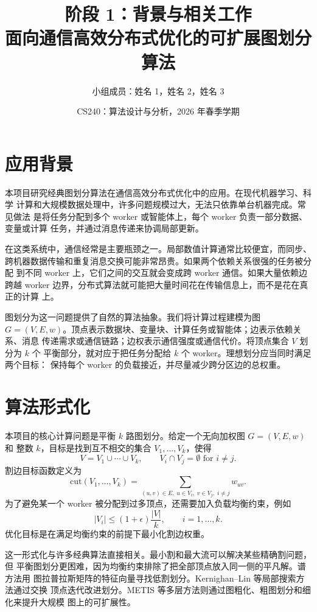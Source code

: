\documentclass[UTF8, 11pt]{ctexart}
\title{\textbf{阶段 1：背景与相关工作}\\
面向通信高效分布式优化的可扩展图划分算法}
\author{小组成员：姓名 1，姓名 2，姓名 3}
\date{CS240：算法设计与分析，2026 年春季学期}
\begin{document}
\maketitle

\section{应用背景}

本项目研究经典图划分算法在通信高效分布式优化中的应用。在现代机器学习、科学
计算和大规模数据处理中，许多问题规模过大，无法只依靠单台机器完成。常见做法
是将任务分配到多个 worker 或智能体上，每个 worker 负责一部分数据、变量或计算
任务，并通过消息传递来协调局部更新。

在这类系统中，通信经常是主要瓶颈之一。局部数值计算通常比较便宜，而同步、
跨机器数据传输和重复消息交换可能非常昂贵。如果两个依赖关系很强的任务被分配
到不同 worker 上，它们之间的交互就会变成跨 worker 通信。如果大量依赖边跨越
worker 边界，分布式算法就可能把大量时间花在传输信息上，而不是花在真正的计算
上。

图划分为这一问题提供了自然的算法抽象。我们将计算过程建模为图
$G=(V,E,w)$。顶点表示数据块、变量块、计算任务或智能体；边表示依赖关系、消息
传递需求或通信链路；边权表示通信强度或通信代价。将顶点集合 $V$ 划分为 $k$ 个
平衡部分，就对应于把任务分配给 $k$ 个 worker。理想划分应当同时满足两个目标：
保持每个 worker 的负载接近，并尽量减少跨分区边的总权重。

\section{算法形式化}

本项目的核心计算问题是平衡 $k$ 路图划分。给定一个无向加权图 $G=(V,E,w)$ 和
整数 $k$，目标是找到互不相交的集合 $V_1,\ldots,V_k$，使得
\[
    V = V_1 \cup \cdots \cup V_k,
    \qquad V_i \cap V_j = \emptyset \text{ for } i\neq j.
\]
割边目标函数定义为
\[
    \mathrm{cut}(V_1,\ldots,V_k)
    =
    \sum_{(u,v)\in E,\; u\in V_i,\; v\in V_j,\; i\neq j} w_{uv}.
\]
为了避免某一个 worker 被分配到过多顶点，还需要加入负载均衡约束，例如
\[
    |V_i| \leq (1+\epsilon)\frac{|V|}{k},
    \qquad i=1,\ldots,k.
\]
优化目标是在满足均衡约束的前提下最小化割边权重。

这一形式化与许多经典算法直接相关。最小割和最大流可以解决某些精确割问题，但
平衡图划分更困难，因为均衡约束排除了把全部顶点放入同一侧的平凡解。谱方法用
图拉普拉斯矩阵的特征向量寻找低割划分。Kernighan--Lin 等局部搜索方法通过交换
顶点迭代改进划分。METIS 等多层方法则通过图粗化、粗图划分和细化来提升大规模
图上的可扩展性。
\end{document}
